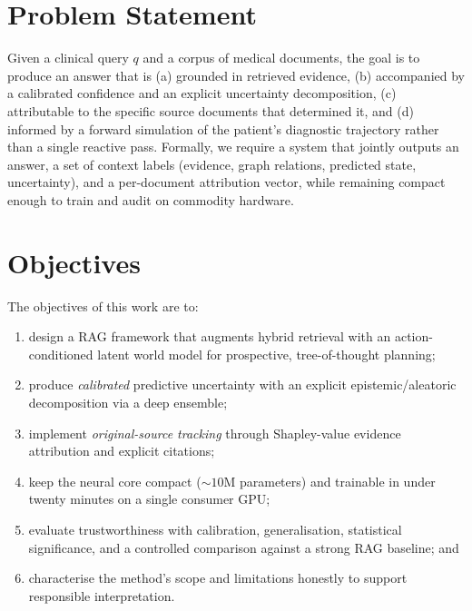 \documentclass[11pt,a4paper]{report}
\begin{document}
\section{Problem Statement}
Given a clinical query $q$ and a corpus of medical documents, the goal is to
produce an answer that is (a) grounded in retrieved evidence, (b) accompanied by
a calibrated confidence and an explicit uncertainty decomposition, (c)
attributable to the specific source documents that determined it, and (d)
informed by a forward simulation of the patient's diagnostic trajectory rather
than a single reactive pass. Formally, we require a system that jointly outputs
an answer, a set of context labels (evidence, graph relations, predicted state,
uncertainty), and a per-document attribution vector, while remaining compact
enough to train and audit on commodity hardware.

\section{Objectives}
The objectives of this work are to:
\begin{enumerate}
\item design a RAG framework that augments hybrid retrieval with an
action-conditioned latent world model for prospective, tree-of-thought planning;
\item produce \emph{calibrated} predictive uncertainty with an explicit
epistemic/aleatoric decomposition via a deep ensemble;
\item implement \emph{original-source tracking} through Shapley-value evidence
attribution and explicit citations;
\item keep the neural core compact ($\sim$$10$M parameters) and trainable in
under twenty minutes on a single consumer GPU;
\item evaluate trustworthiness with calibration, generalisation, statistical
significance, and a controlled comparison against a strong RAG baseline; and
\item characterise the method's scope and limitations honestly to support
responsible interpretation.
\end{enumerate}
\end{document}

